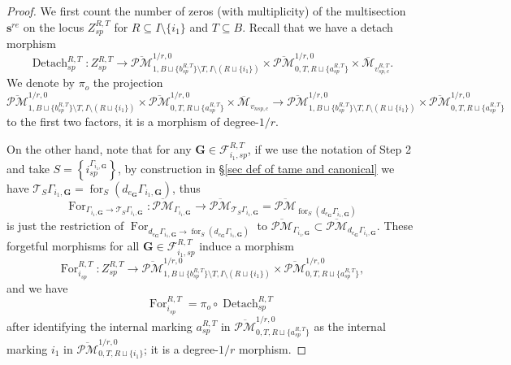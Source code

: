\documentclass[11pt]{amsart}
\theoremstyle{definition}
\theoremstyle{remark}
\newcommand{\oPMb}{{\overline{\mathcal{PM}}}}
\newcommand{\<}{\left<}
\renewcommand{\>}{\right>}
\numberwithin{equation}{section}
\def\Mbar{{\overline{\mathcal M}}}
\begin{document}
\begin{proof}
         We first count the  number of zeros (with multiplicity) of the multisection $\bm{s}^{re}$ on the locus $Z_{sp}^{R,T}$ for  $R\subseteq I\setminus\{i_1\}$ and $T\subseteq B$. 
          Recall that we have a detach morphism 
         $$
         \operatorname{Detach}_{sp}^{R,T}\colon Z^{R,T}_{sp} \to \oPMb^{1/r,0}_{1,B\sqcup \{b^{R,T}_{sp}\} \setminus T,I\setminus (R\sqcup \{i_1\})} \times \oPMb^{1/r,0}_{0,T,R\sqcup \{a^{R,T}_{sp}\}}\times \Mbar_{v_{sp,c}^{R,T}}.
         $$
         We denote by $\pi_{o}$ the %
projection
         \begin{equation*}
              \oPMb^{1/r,0}_{1,B\sqcup \{b^{R,T}_{sp}\} \setminus T,I\setminus (R\sqcup \{i_1\})} \times \oPMb^{1/r,0}_{0,T,R\sqcup \{a^{R,T}_{sp}\}}\times \Mbar_{v_{nsp,c}} \to  \oPMb^{1/r,0}_{1,B\sqcup \{b^{R,T}_{sp}\} \setminus T,I\setminus (R\sqcup \{i_1\})} \times \oPMb^{1/r,0}_{0,T,R\sqcup \{a^{R,T}_{sp}\}}
         \end{equation*}
         to %
the first two factors, it is a morphism of degree-$1/r$.  

         On the other hand, note that for any $\bm{G}\in \mathcal F_{i_1,sp}^{R,T}$, if we use the notation of Step 2 and take $S=\left\{i_{sp}^{\Gamma_{i_1,\bm{G}}}\right\}$, by construction in \S \ref{sec def of tame and canonical} we have 
         $\mathcal T_{S}\Gamma_{i_1,\bm{G}}=\operatorname{for}_{S}(d_{e_{\bm{G}}}\Gamma_{i_1,\bm{G}})$, thus 
         $$
         \operatorname{For}_{\Gamma_{i_1,\bm{G}}\to \mathcal T_{S}\Gamma_{i_1,\bm{G}}}\colon \oPMb_{\Gamma_{i_1,\bm{G}}}\to \oPMb_{\mathcal T_{S}\Gamma_{i_1,\bm{G}}}=\oPMb_{\operatorname{for}_{S}(d_{e_{\bm{G}}}\Gamma_{i_1,\bm{G}})}
         $$ 
         is just the restriction of 
         $\operatorname{For}_{d_{e_{\bm{G}}}\Gamma_{i_1,\bm{G}}\to \operatorname{for}_{S}(d_{e_{\bm{G}}}\Gamma_{i_1,\bm{G}})}$ to $\oPMb_{\Gamma_{i_1,\bm{G}}}\subset \oPMb_{d_{e_{\bm{G}}}\Gamma_{i_1,\bm{G}}}$. These forgetful morphisms for all $\bm{G}\in \mathcal F_{i_1,sp}^{R,T}$ induce a morphism
         $$
         \operatorname{For}_{i_{sp}}^{R,T}\colon Z_{sp}^{R,T}\to \oPMb^{1/r,0}_{1,B\sqcup \{b^{R,T}_{sp}\} \setminus T,I\setminus (R\sqcup \{i_1\})} \times \oPMb^{1/r,0}_{0,T,R\sqcup \{a^{R,T}_{sp}\}},
         $$
         and we have 
         $$
         \operatorname{For}_{i_{sp}}^{R,T}=\pi_o\circ  \operatorname{Detach}_{sp}^{R,T}
         $$
         after identifying the internal marking $a^{R,T}_{sp}$ in $ \oPMb^{1/r,0}_{0,T,R\sqcup \{a^{R,T}_{sp}\}}$ as the internal marking $i_1$ in $ \oPMb^{1/r,0}_{0,T,R\sqcup \{i_1\}}$; it is a degree-$1/r$ morphism. 
         

\end{proof}
\end{document}
